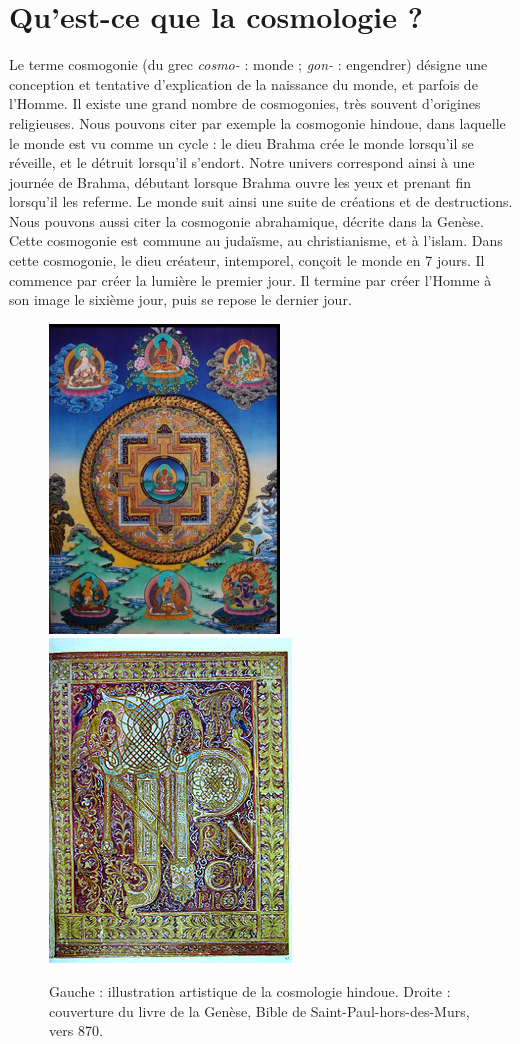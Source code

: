 \section{Qu'est-ce que la cosmologie ?}
Le terme cosmogonie (du grec \emph{cosmo-} : monde ; \emph{gon-} : engendrer) désigne une conception et tentative d'explication de la naissance du monde, et parfois de l'Homme. Il existe une grand nombre de cosmogonies, très souvent d'origines religieuses. Nous pouvons citer par exemple la cosmogonie hindoue, dans laquelle le monde est vu comme un cycle : le dieu Brahma crée le monde lorsqu'il se réveille, et le détruit lorsqu'il s'endort. Notre univers correspond ainsi à une journée de Brahma, débutant lorsque Brahma ouvre les yeux et prenant fin lorsqu'il les referme. Le monde suit ainsi une suite de créations et de destructions.
Nous pouvons aussi citer la cosmogonie abrahamique, décrite dans la Genèse. Cette cosmogonie est commune au judaïsme, au christianisme, et à l'islam. Dans cette cosmogonie, le dieu créateur, intemporel, conçoit le monde en 7 jours. Il commence par créer la lumière le premier jour. Il termine par créer l'Homme à son image le sixième jour, puis se repose le dernier jour.
\begin{figure}[b]
  \centering
  \includegraphics[scale=1]{cosmohindoue.png}
  \hspace{3cm}
  \includegraphics[scale=1]{genese.png}
  \caption{Gauche : illustration artistique de la cosmologie hindoue. Droite : couverture du livre de la Genèse, Bible de Saint-Paul-hors-des-Murs, vers 870.}
  \label{fig:cosmohindoue}
\end{figure}


